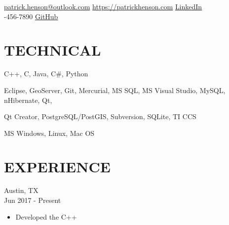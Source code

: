 \documentclass[10pt]{article}
\begin{document}
\renewcommand\familydefault{\sfdefault}



\hfill

\noindent\hrulefill

\noindent 
\href{mailto:fullname@email.com}{patrick.henson@outlook.com}
\hfill
\href{https://patrickhenson.com}{https://patrickhenson.com}
\hfill
\href{linkedin.com/in/patrickhenson}{LinkedIn}
\\
-456-7890
\hfill
\href{https://github.com/PatrickHenson}{GitHub}

\section*{TECHNICAL}

 \hspace{5.0em}
C++, C, Java, C\#, Python

 \hspace{1.0em}
Eclipse, GeoServer, Git, Mercurial, MS SQL, MS Visual Studio, MySQL, nHibernate, Qt,

\hspace{9.0em} Qt Creator, PostgreSQL/PostGIS, Subversion, SQLite, TI CCS

 \hspace{0.5em}
MS Windows, Linux, Mac OS

\section*{EXPERIENCE}

 \hfill Austin, TX \\
 \hfill Jun 2017 - Present
\begin{itemize}
\setlength\itemsep{0em}
\item Developed the C++
\end{itemize}
\end{document}
